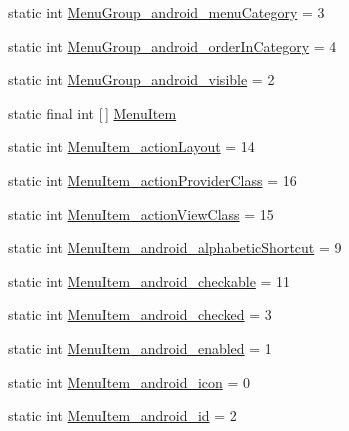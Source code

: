 \begin{DoxyCompactItemize}
\item 
static int \hyperlink{classandroid_1_1support_1_1v7_1_1cardview_1_1R_1_1styleable_a9b40234702a38415a4aa0fd579147bc7}{Menu\+Group\+\_\+android\+\_\+menu\+Category} = 3
\item 
static int \hyperlink{classandroid_1_1support_1_1v7_1_1cardview_1_1R_1_1styleable_aef91bfa862344302a0155c4e3ba835ff}{Menu\+Group\+\_\+android\+\_\+order\+In\+Category} = 4
\item 
static int \hyperlink{classandroid_1_1support_1_1v7_1_1cardview_1_1R_1_1styleable_ae7d9cea3e094885fafcecd55addf2ff0}{Menu\+Group\+\_\+android\+\_\+visible} = 2
\item 
static final int \mbox{[}$\,$\mbox{]} \hyperlink{classandroid_1_1support_1_1v7_1_1cardview_1_1R_1_1styleable_a0a483b830af809d94b22d4901e758447}{Menu\+Item}
\item 
static int \hyperlink{classandroid_1_1support_1_1v7_1_1cardview_1_1R_1_1styleable_afc66347211033a94261991c2716632bc}{Menu\+Item\+\_\+action\+Layout} = 14
\item 
static int \hyperlink{classandroid_1_1support_1_1v7_1_1cardview_1_1R_1_1styleable_a2fcf53a7e48550c4f268ac01853a1655}{Menu\+Item\+\_\+action\+Provider\+Class} = 16
\item 
static int \hyperlink{classandroid_1_1support_1_1v7_1_1cardview_1_1R_1_1styleable_a68225a0f12a88cf1ba29787d1c3653f7}{Menu\+Item\+\_\+action\+View\+Class} = 15
\item 
static int \hyperlink{classandroid_1_1support_1_1v7_1_1cardview_1_1R_1_1styleable_a0b91d93cd360e9465c306a85707eb4ac}{Menu\+Item\+\_\+android\+\_\+alphabetic\+Shortcut} = 9
\item 
static int \hyperlink{classandroid_1_1support_1_1v7_1_1cardview_1_1R_1_1styleable_a1ab1fd5f17ea58611817a12d2ef3713b}{Menu\+Item\+\_\+android\+\_\+checkable} = 11
\item 
static int \hyperlink{classandroid_1_1support_1_1v7_1_1cardview_1_1R_1_1styleable_a4ffc529c71f2f0638450bac64fa53cfc}{Menu\+Item\+\_\+android\+\_\+checked} = 3
\item 
static int \hyperlink{classandroid_1_1support_1_1v7_1_1cardview_1_1R_1_1styleable_a74813299c9b7535e4ba2a80e13f710f1}{Menu\+Item\+\_\+android\+\_\+enabled} = 1
\item 
static int \hyperlink{classandroid_1_1support_1_1v7_1_1cardview_1_1R_1_1styleable_a9a74a73962dfd31a08f9c5012b4a47ad}{Menu\+Item\+\_\+android\+\_\+icon} = 0
\item 
static int \hyperlink{classandroid_1_1support_1_1v7_1_1cardview_1_1R_1_1styleable_aceedae784a2b71f1563676652a79235d}{Menu\+Item\+\_\+android\+\_\+id} = 2

\end{DoxyCompactItemize}
